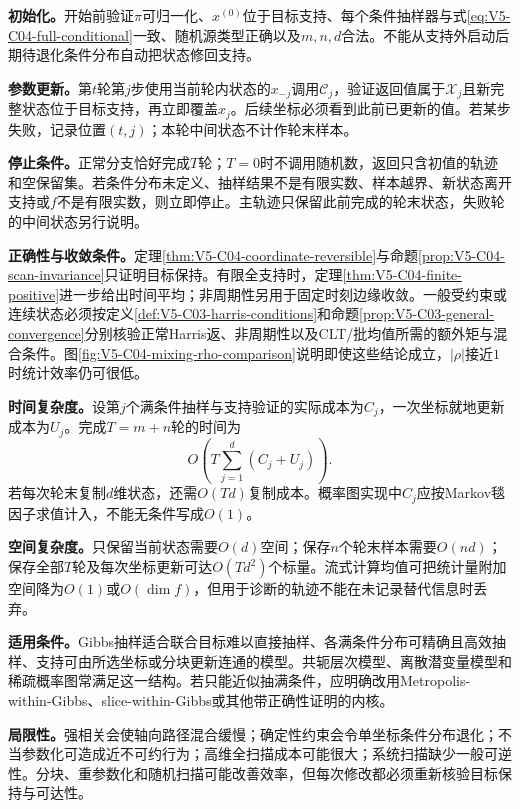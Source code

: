 \label{struct:V5-C04-CH22}
\textbf{初始化。}开始前验证$\pi$可归一化、$x^{(0)}$位于目标支持、每个条件抽样器与式\eqref{eq:V5-C04-full-conditional}一致、随机源类型正确以及$m,n,d$合法。不能从支持外启动后期待退化条件分布自动把状态修回支持。

\label{struct:V5-C04-CH23}
\textbf{参数更新。}第$t$轮第$j$步使用当前轮内状态的$x_{-j}$调用$\mathcal C_j$，验证返回值属于$\mathcal X_j$且新完整状态位于目标支持，再立即覆盖$x_j$。后续坐标必须看到此前已更新的值。若某步失败，记录位置$(t,j)$；本轮中间状态不计作轮末样本。

\label{struct:V5-C04-CH24}
\textbf{停止条件。}正常分支恰好完成$T$轮；$T=0$时不调用随机数，返回只含初值的轨迹和空保留集。若条件分布未定义、抽样结果不是有限实数、样本越界、新状态离开支持或$f$不是有限实数，则立即停止。主轨迹只保留此前完成的轮末状态，失败轮的中间状态另行说明。

\label{struct:V5-C04-CH25}
\textbf{正确性与收敛条件。}定理\ref{thm:V5-C04-coordinate-reversible}与命题\ref{prop:V5-C04-scan-invariance}只证明目标保持。有限全支持时，定理\ref{thm:V5-C04-finite-positive}进一步给出时间平均；非周期性另用于固定时刻边缘收敛。一般受约束或连续状态必须按定义\ref{def:V5-C03-harris-conditions}和命题\ref{prop:V5-C03-general-convergence}分别核验正常Harris返、非周期性以及CLT/批均值所需的额外矩与混合条件。图\ref{fig:V5-C04-mixing-rho-comparison}说明即使这些结论成立，$|\rho|$接近$1$时统计效率仍可很低。

\label{struct:V5-C04-CH26}
\textbf{时间复杂度。}设第$j$个满条件抽样与支持验证的实际成本为$C_j$，一次坐标就地更新成本为$U_j$。完成$T=m+n$轮的时间为
\[
O\!\left(T\sum_{j=1}^d(C_j+U_j)\right).
\]
若每次轮末复制$d$维状态，还需$O(Td)$复制成本。概率图实现中$C_j$应按Markov毯因子求值计入，不能无条件写成$O(1)$。

\label{struct:V5-C04-CH27}
\textbf{空间复杂度。}只保留当前状态需要$O(d)$空间；保存$n$个轮末样本需要$O(nd)$；保存全部$T$轮及每次坐标更新可达$O(Td^2)$个标量。流式计算均值可把统计量附加空间降为$O(1)$或$O(\dim f)$，但用于诊断的轨迹不能在未记录替代信息时丢弃。

\label{struct:V5-C04-CH28}
\textbf{适用条件。}Gibbs抽样适合联合目标难以直接抽样、各满条件分布可精确且高效抽样、支持可由所选坐标或分块更新连通的模型。共轭层次模型、离散潜变量模型和稀疏概率图常满足这一结构。若只能近似抽满条件，应明确改用Metropolis-within-Gibbs、slice-within-Gibbs或其他带正确性证明的内核。

\pagebreak[4]
\label{struct:V5-C04-CH29}
\textbf{局限性。}强相关会使轴向路径混合缓慢；确定性约束会令单坐标条件分布退化；不当参数化可造成近不可约行为；高维全扫描成本可能很大；系统扫描缺少一般可逆性。分块、重参数化和随机扫描可能改善效率，但每次修改都必须重新核验目标保持与可达性。


